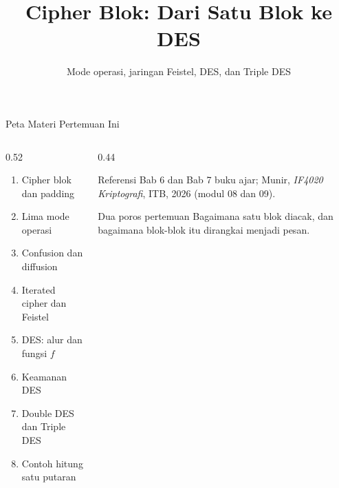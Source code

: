 \documentclass[aspectratio=169,11pt]{beamer}
\title{Cipher Blok: Dari Satu Blok ke DES}
\subtitle{Mode operasi, jaringan Feistel, DES, dan Triple DES}
\begin{document}
\begin{frame}[plain]
    \titlepage
\end{frame}

\begin{frame}{Peta Materi Pertemuan Ini}
    \footnotesize
    \begin{columns}[T,onlytextwidth]
        \begin{column}{0.52\textwidth}
            \begin{enumerate}
                \item Cipher blok dan padding
                \item Lima mode operasi
                \item Confusion dan diffusion
                \item Iterated cipher dan Feistel
                \item DES: alur dan fungsi $f$
                \item Keamanan DES
                \item Double DES dan Triple DES
                \item Contoh hitung satu putaran
            \end{enumerate}
        \end{column}
        \begin{column}{0.44\textwidth}
            \begin{block}{Referensi}
                \footnotesize
                Bab 6 dan Bab 7 buku ajar; Munir, \textit{IF4020
                Kriptografi}, ITB, 2026 (modul 08 dan 09).
            \end{block}
            \begin{exampleblock}{Dua poros pertemuan}
                \footnotesize
                Bagaimana satu blok diacak, dan bagaimana blok-blok itu
                dirangkai menjadi pesan.
            \end{exampleblock}
        \end{column}
    \end{columns}
\end{frame}
\end{document}
